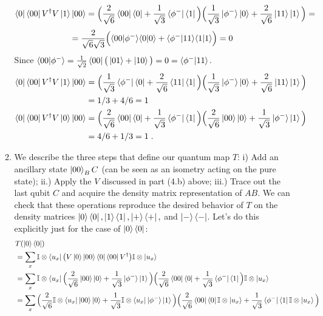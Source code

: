 \documentclass[12pt]{article}
\begin{document}
\begin{enumerate}
\begin{enumerate}
$$ \bra{0}\bra{00}V^\dagger V\ket{1}\ket{00} = \Big(
\frac{2}{\sqrt{6}} \bra{00}\bra{0} + \frac{1}{\sqrt{3}} \bra{\phi^-}\bra{1}\Big)
\Big(
\frac{1}{\sqrt{3}} \ket{\phi^-}\ket{0} + \frac{2}{\sqrt{6}} \ket{11}\ket{1}\Big) = $$
$$=
\frac{2}{\sqrt{6}\sqrt{3}}  \Big(
\langle 00 \vert \phi^-\rangle\langle 0 \vert 0\rangle + \langle \phi^- \vert 11\rangle\langle 1 \vert 1\rangle\Big) = 0$$
Since $\langle 00 \vert \phi^-\rangle = \frac{1}{\sqrt{2}}\bra{00} \big( \ket{01} + \ket{10}\big) = 0 =\langle \phi^- \vert 11\rangle$.
\begin{align*}
\bra{0}\bra{00}V^\dagger V\ket{1}\ket{00} &= \Big(
\frac{1}{\sqrt{3}} \bra{\phi^-}\bra{0} + \frac{2}{\sqrt{6}} \bra{11}\bra{1}\Big)
\Big(
\frac{1}{\sqrt{3}} \ket{\phi^-}\ket{0} + \frac{2}{\sqrt{6}} \ket{11}\ket{1}\Big) \\
&= 1/3 + 4/6 = 1\\
\bra{0}\bra{00}V^\dagger V\ket{0}\ket{00} &= \Big(
\frac{2}{\sqrt{6}} \bra{00}\bra{0} + \frac{1}{\sqrt{3}} \bra{\phi^-}\bra{1}\Big)
\Big(
\frac{2}{\sqrt{6}} \ket{00}\ket{0} + \frac{1}{\sqrt{3}} \ket{\phi^-}\ket{1}\Big) \\
&= 4/6 + 1/3 = 1 \;.
\end{align*}
\item 
We  describe the three steps that define our quantum map $T$: i) Add an ancillary state $\ket{00}_BC$ (can be seen as an isometry acting on the pure state); ii.) Apply the $V$ discussed in part (4.b) above; iii.) Trace out the last qubit $C$ and acquire the density matrix representation of $AB$. We can check that these operations reproduce the desired behavior of $T$ on the density matrices $\ket{0}\bra{0}, \ket{1}\bra{1}, \ket{+}\bra{+},$ and $\ket{-}\bra{-}$. Let's do this explicitly just for the case of $\ket{0}\bra{0}$:
\begin{align*}
  & T(\ket{0}\bra{0})\\
	&= 
\sum_x \mathbb{I}\otimes \bra{u_x} \big(V \ket{0}\ket{00}\bra{0}\bra{00} V^\dagger \big)\mathbb{I}\otimes \ket{u_x} \\
&= \sum_x \mathbb{I}\otimes \bra{u_x} 
\Big(
\frac{2}{\sqrt{6}} \ket{00}\ket{0} + \frac{1}{\sqrt{3}} \ket{\phi^-}\ket{1}\Big)
\Big(
\frac{2}{\sqrt{6}} \bra{00}\bra{0} + \frac{1}{\sqrt{3}} \bra{\phi^-}\bra{1}\Big)
\mathbb{I}\otimes \ket{u_x} \\
&= \sum_x 
\Big(
\frac{2}{\sqrt{6}} \mathbb{I}\otimes \bra{u_x} \ket{00}\ket{0} + \frac{1}{\sqrt{3}} \mathbb{I}\otimes \bra{u_x} \ket{\phi^-}\ket{1}\Big)
\Big(
\frac{2}{\sqrt{6}} \bra{00}\bra{0} \mathbb{I}\otimes \ket{u_x} + \frac{1}{\sqrt{3}} \bra{\phi^-}\bra{1} \mathbb{I}\otimes \ket{u_x}\Big)\\

\end{align*}
\end{enumerate}
\end{enumerate}
\end{document}

